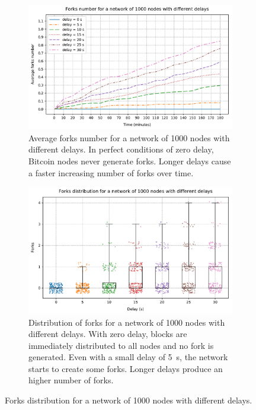 \begin{figure}[h]
	\begin{subfigure}{\textwidth}
		\centering
		\includegraphics[width=\myplotswitdth \columnwidth]{plots/forks_delay_1000_linechart}
		\vspace*{0.25cm}
		\caption{
			Average forks number for a network of \num{1000} nodes with different delays.
			In perfect conditions of zero delay, Bitcoin nodes never generate forks.
			Longer delays cause a faster increasing number of forks over time.
		}
		\vspace*{0.75cm}
	\end{subfigure}
	\begin{subfigure}{\textwidth}
		\centering
		\vspace*{0.25cm}
		\includegraphics[width=\myplotswitdth \columnwidth]{plots/forks_delay_1000_boxplot}
		\vspace*{0.25cm}
		\caption{
			Distribution of forks for a network of \num{1000} nodes with different delays.
			With zero delay, blocks are immediately distributed to all nodes and no fork is generated.
			Even with a small delay of \SI{5}{\second}, the network starts to create some forks.
			Longer delays produce an higher number of forks.
		}
		\vspace*{0.25cm}
	\end{subfigure}
	\caption[Forks distribution for a network of 1000 nodes with different delays]{
		Forks distribution for a network of \num{1000} nodes with different delays.
	}
	\label{fig:forks-delay-1000}
\end{figure}

